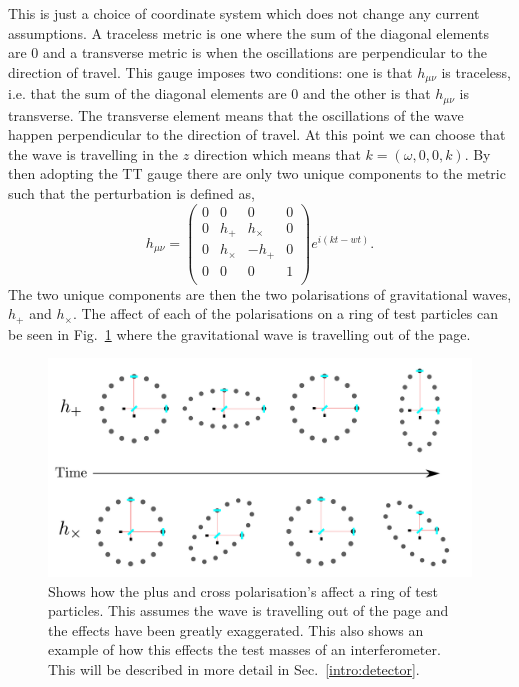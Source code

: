 This is just a choice of coordinate system which does not change any current assumptions. A traceless metric is one where the sum of the diagonal elements are 0 and a transverse metric is when the oscillations are perpendicular to the direction of travel. 
This gauge imposes two conditions: one is that $h_{\mu \nu}$ is traceless, i.e. that the sum of the diagonal elements are 0 and the other is that $h_{\mu \nu}$ is transverse. 
The transverse element means that the oscillations of the wave happen perpendicular to the direction of travel.
At this point we can choose that the wave is travelling in the $z$ direction which means that $k = (\omega,0,0,k)$.
By then adopting the TT gauge there are only two unique components to the metric such that the perturbation is defined as,
\begin{equation}
\label{intro:gw:gravwave}
h_{\mu \nu} = \left( 
\begin{matrix}
0 & 0 & 0 & 0 \\
0 & h_{+} & h_{\times} & 0 \\
0 & h_{\times} & -h_{+} & 0 \\
0 & 0 & 0 & 1 \\
\end{matrix}
\right) 
e^{i(kt - wt)}.
\end{equation}
The two unique components are then the two polarisations of gravitational waves, $h_{+}$ and $h_{\times}$.
The affect of each of the polarisations on a ring of test particles can be seen in Fig.~\ref{gw:polarisations} where the gravitational wave is travelling out of the page.

\begin{figure}[h]
    \centering
    \includegraphics[width=\textwidth]{C1_intro/polarisation_ring.pdf}
    \caption{Shows how the plus and cross polarisation's affect a ring of test particles. This assumes the wave is travelling out of the page and the effects have been greatly exaggerated. This also shows an example of how this effects the test masses of an interferometer. This will be described in more detail in Sec.~\ref{intro:detector}.}
    \label{gw:polarisations}
\end{figure}



